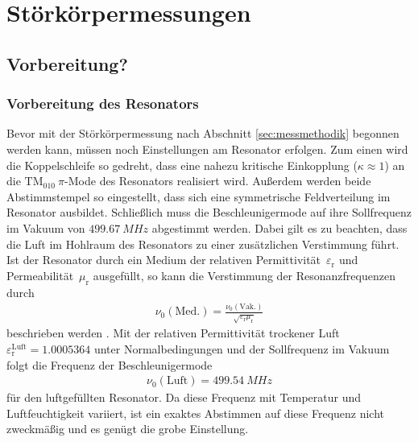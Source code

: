 \chapter{Störkörpermessungen}
\label{sec:stoerkoerpermessung}
\section{Vorbereitung?}

\subsection{Vorbereitung des Resonators}
Bevor mit der Störkörpermessung nach Abschnitt \ref{sec:messmethodik} begonnen werden kann, müssen noch Einstellungen am Resonator erfolgen.
Zum einen wird die Koppelschleife so gedreht, dass eine nahezu kritische Einkopplung ($\kappa \approx 1$) an die $\mathrm{TM}_{010}~\pi$-Mode des Resonators realisiert wird.
Außerdem werden beide Abstimmstempel so eingestellt, dass sich eine symmetrische Feldverteilung im Resonator ausbildet.
Schließlich muss die Beschleunigermode auf ihre Sollfrequenz im Vakuum von $\SI{499.67}{MHz}$ abgestimmt werden.
Dabei gilt es zu beachten, dass die Luft im Hohlraum des Resonators zu einer zusätzlichen Verstimmung führt.
Ist der Resonator durch ein Medium der relativen Permittivität~$\varepsilon_\mathrm{r}$ und Permeabilität~$\mu_\mathrm{r}$ ausgefüllt, so kann die Verstimmung der Resonanzfrequenzen durch
\begin{align}
	\nu_0(\mathrm{Med.}) = \frac{\nu_0(\mathrm{Vak.})}{\sqrt{\varepsilon_\mathrm{r} \mu_\mathrm{r}}}
\end{align}
beschrieben werden \cite{pusch}.
Mit der relativen Permittivität trockener Luft~$\varepsilon_\mathrm{r}^\mathrm{Luft} = \num{1.0005364}$ unter Normalbedingungen \cite[S.\ 1093]{CRC} und der Sollfrequenz im Vakuum folgt die Frequenz der Beschleunigermode
\begin{align}
	\nu_0(\mathrm{Luft}) = \SI{499.54}{MHz}
\end{align}
für den luftgefüllten Resonator.
Da diese Frequenz mit Temperatur und Luftfeuchtigkeit variiert, ist ein exaktes Abstimmen auf diese Frequenz nicht zweckmäßig und es genügt die grobe Einstellung.

